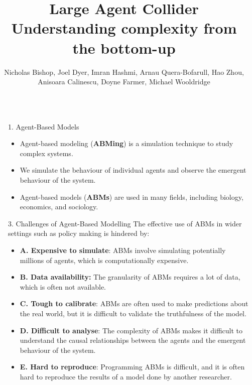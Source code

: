 \documentclass[final,hyperref={pdfpagelabels=false}]{beamer}
\title{\Huge Large Agent Collider\\ Understanding complexity from the bottom-up} %
\author{Nicholas Bishop, Joel Dyer, Imran Hashmi, Arnau Quera-Bofarull, Hao Zhou, Anisoara Calinescu, Doyne Farmer, Michael Wooldridge}
\institute{Department of Computer Science, University of Oxford\\\vspace{4mm}
\texttt{\{name.surname\}@cs.ox.ac.uk}}
\newcommand{\shrink}{-15pt}
\begin{document}

\begin{frame}[t] %

\begin{columns}[t] %

  \begin{column}{.02\textwidth}\end{column} %


  \begin{column}{.4\textwidth} %

    \vspace{\shrink}          
    \begin{block}{1. Agent-Based Models}
      \begin{itemize}
          \item Agent-based modeling (\textbf{ABMing}) is a simulation technique to study complex systems.
          \item We simulate the behaviour of individual agents and observe the emergent behaviour of the system.
          \item Agent-based models (\textbf{ABMs}) are used in many fields, including biology, economics, and sociology.
      \end{itemize}
    \end{block}
    \begin{block}{3. Challenges of Agent-Based Modelling}
      The effective use of ABMs in wider settings such as policy making is hindered by:
      \begin{itemize}
        \item\justifying \textbf{A. Expensive to simulate}: ABMs involve simulating potentially millions of agents, which is computationally expensive.
        \item\justifying \textbf{B. Data availability:} The granularity of ABMs requires a lot of data, which is often not available.
        \item\justifying\textbf{C. Tough to calibrate}: ABMs are often used to make predictions about the real world, but it is difficult to validate the truthfulness of the model.
        \item\justifying \textbf{D. Difficult to analyse}: The complexity of ABMs makes it difficult to understand the causal 
          relationships between the agents and the emergent behaviour of the system.
        \item\justifying \textbf{E. Hard to reproduce}: Programming ABMs is difficult, and it is often hard to 
          reproduce the results of a model done by another researcher.
      \end{itemize}
    \end{block}


\end{column}
\end{columns}
\end{frame}
\end{document}
